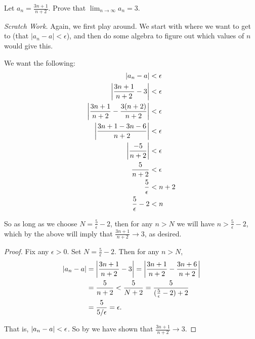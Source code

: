 \documentclass[11pt,twoside=off,numbers=noenddot]{scrbook}
\begin{document}
\begin{example}
  Let $a_n = \frac{3n+1}{n+2}$. Prove that $\lim_{n\to\infty} a_n = 3$.

  \textit{Scratch Work.} Again, we first play around. We start with
  where we want to get to (that $|a_n - a| < \epsilon$), and then
  do some algebra to figure out which values of $n$ would give this.

  We want the following:
  \begin{align*}
    | a_n - a | &< \epsilon\\
    \left|\frac{3n+1}{n+2} - 3\right| &< \epsilon\\
    \left|\frac{3n+1}{n+2} - \frac{3(n+2)}{n+2}\right| &< \epsilon\\
    \left|\frac{3n+1-3n-6}{n+2}\right| &< \epsilon\\
    \left|\frac{-5}{n+2}\right| &< \epsilon\\
    \frac{5}{n+2} &< \epsilon\\
    \frac{5}{\epsilon} &< n+2\\
    \frac{5}{\epsilon} - 2 &< n
  \end{align*}

  So as long as we choose $N = \frac{5}{\epsilon} - 2$, then for
  any $n > N$ we will have $n > \frac{5}{\epsilon} - 2$, which by
  the above will imply that $\frac{3n+1}{n+2} \to 3$, as desired.

  \begin{proof}
    Fix any $\epsilon > 0$. Set $N = \frac{5}{\epsilon} - 2$.
    Then for any $n > N$,
    \begin{align*}
      | a_n - a | &= \left|\frac{3n+1}{n+2} - 3\right| =
      \left|\frac{3n+1}{n+2} - \frac{3n+6}{n+2}\right|\\
      &= \frac{5}{n+2} < \frac{5}{N+2} =
      \frac{5}{(\frac{5}{\epsilon} - 2) + 2}\\
      &= \frac{5}{5/\epsilon} = \epsilon.
    \end{align*}

    That is, $| a_n - a | < \epsilon$. So by
     we have
    shown that $\frac{3n+1}{n+2} \to 3$.
  \end{proof}
\end{example}
\end{document}
